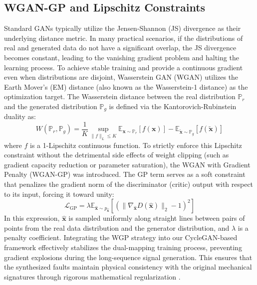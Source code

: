 \subsection{WGAN-GP and Lipschitz Constraints}
Standard GANs typically utilize the Jensen-Shannon (JS) divergence as their underlying distance metric. In many practical scenarios, if the distributions of real and generated data do not have a significant overlap, the JS divergence becomes constant, leading to the vanishing gradient problem and halting the learning process. To achieve stable training and provide a continuous gradient even when distributions are disjoint, Wasserstein GAN (WGAN) \cite{arjovsky2017wgan} utilizes the Earth Mover's (EM) distance (also known as the Wasserstein-1 distance) as the optimization target. The Wasserstein distance between the real distribution $\mathbb{P}_r$ and the generated distribution $\mathbb{P}_g$ is defined via the Kantorovich-Rubinstein duality as:
\begin{equation}
W(\mathbb{P}_r, \mathbb{P}_g) = \frac{1}{K} \sup_{\|f\|_L \le K} \mathbb{E}_{\boldsymbol{x} \sim \mathbb{P}_r}[f(\boldsymbol{x})] - \mathbb{E}_{\tilde{\boldsymbol{x}} \sim \mathbb{P}_g}[f(\tilde{\boldsymbol{x}})]
\end{equation}
where $f$ is a 1-Lipschitz continuous function. To strictly enforce this Lipschitz constraint without the detrimental side effects of weight clipping (such as gradient capacity reduction or parameter saturation), the WGAN with Gradient Penalty (WGAN-GP) \cite{gulrajani2017wgangp} was introduced. The GP term serves as a soft constraint that penalizes the gradient norm of the discriminator (critic) output with respect to its input, forcing it toward unity:
\begin{equation}
\mathcal{L}_{\text{GP}} = \lambda \mathbb{E}_{\hat{\boldsymbol{x}} \sim p_{\hat{\boldsymbol{x}}}} [(\|\nabla_{\hat{\boldsymbol{x}}} D(\hat{\boldsymbol{x}})\|_2 - 1)^2]
\end{equation}
In this expression, $\hat{\boldsymbol{x}}$ is sampled uniformly along straight lines between pairs of points from the real data distribution and the generator distribution, and $\lambda$ is a penalty coefficient. Integrating the WGP strategy into our CycleGAN-based framework effectively stabilizes the dual-mapping training process, preventing gradient explosions during the long-sequence signal generation. This ensures that the synthesized faults maintain physical consistency with the original mechanical signatures through rigorous mathematical regularization \cite{han2020wgangp_bearing, meng2022iacgan, gulrajani2017wgangp}.
